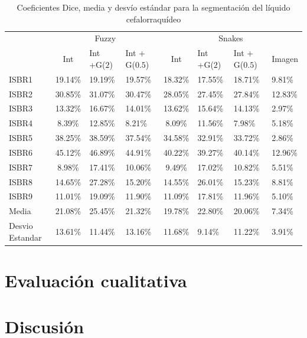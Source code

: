 \begin{table}[h]
	\centering
	\begin{tabular}{l|cll|clll}
		& \multicolumn{3}{c|}{Fuzzy} & \multicolumn{4}{c}{Snakes} \\ \cline{2-8} 
		& Int & Int +G($2$) & Int + G($0.5$) & Int & Int +G($2$) & Int + G($0.5$) & Imagen \\ \hline
		ISBR1 & 19.14\% & 19.19\% & 19.57\% & 18.32\% & 17.55\% & 18.71\% & 9.81\% \\
		ISBR2 & 30.85\% & 31.07\% & 30.47\% & 28.05\% & 27.45\% & 27.84\% & 12.83\% \\
		ISBR3 & 13.32\% & 16.67\% & 14.01\% & 13.62\% & 15.64\% & 14.13\% & 2.97\% \\
		ISBR4 & 8.39\% & 12.85\% & 8.21\% & 8.09\% & 11.56\% & 7.98\% & 5.18\% \\
		ISBR5 & 38.25\% & 38.59\% & 37.54\% & 34.58\% & 32.91\% & 33.72\% & 2.86\% \\
		ISBR6 & 45.12\% & 46.89\% & 44.91\% & 40.22\% & 39.27\% & 40.14\% & 12.96\% \\
		ISBR7 & 8.98\% & 17.41\% & 10.06\% & 9.49\% & 17.02\% & 10.82\% & 5.51\% \\
		ISBR8 & 14.65\% & 27.28\% & 15.20\% & 14.55\% & 26.01\% & 15.23\% & 8.81\% \\
		ISBR9 & 11.01\% & 19.09\% & 11.90\% & 11.09\% & 17.81\% & 11.96\% & 5.10\% \\ \hline
		Media & 21.08\% & 25.45\% & 21.32\% & 19.78\% & 22.80\% & 20.06\% & 7.34\% \\ \hline
		Desvio Estandar & 13.61\% & 11.44\% & 13.16\% & 11.68\% & 9.14\% & 11.22\% & 3.91\%
	\end{tabular}
	\caption{Coeficientes Dice, media y desvío estándar para la segmentación del líquido cefalorraquídeo}
	\label{table:resultados_liquido}
\end{table}


\section{Evaluación cualitativa}
\section{Discusión}